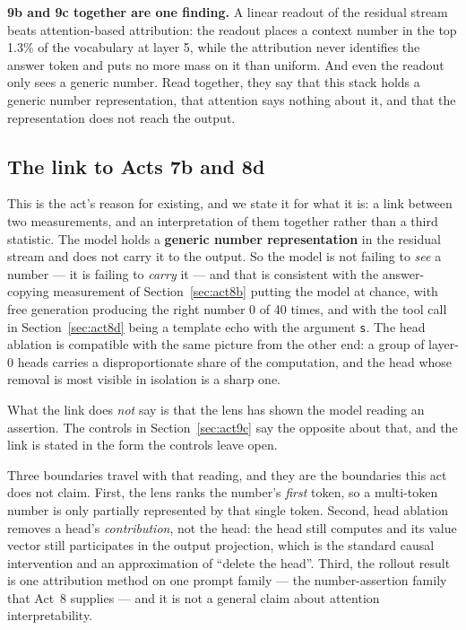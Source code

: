 \documentclass[11pt,a4paper]{article}
\begin{document}
\textbf{9b and 9c together are one finding.} A linear readout of the
residual stream beats attention-based attribution: the readout places a
context number in the top 1.3\% of the vocabulary at layer 5, while the
attribution never identifies the answer token and puts no more mass on it than
uniform. And even the readout only sees a generic number. Read together, they
say that this stack holds a generic number representation, that attention
says nothing about it, and that the representation does not reach the output.

\subsection{The link to Acts 7b and 8d}
\label{sec:act9-link}

This is the act's reason for existing, and we state it for what it is: a link
between two measurements, and an interpretation of them together rather than a
third statistic. The model holds a \textbf{generic number representation} in
the residual stream and does not carry it to the output. So the model is not
failing to \emph{see} a number --- it is failing to \emph{carry} it --- and
that is consistent with the answer-copying measurement of
Section~\ref{sec:act8b} putting the model at chance, with free generation
producing the right number 0 of 40 times, and with the tool call in
Section~\ref{sec:act8d} being a template echo with the argument \texttt{s}.
The head ablation is compatible with the same picture from the other end: a
group of layer-0 heads carries a disproportionate share of the computation,
and the head whose removal is most visible in isolation is a sharp one.

What the link does \emph{not} say is that the lens has shown the model
reading an assertion. The controls in Section~\ref{sec:act9c} say the
opposite about that, and the link is stated in the form the controls leave
open.

Three boundaries travel with that reading, and they are the boundaries this
act does not claim. First, the lens ranks the number's \emph{first} token, so
a multi-token number is only partially represented by that single token.
Second, head ablation removes a head's \emph{contribution}, not the head: the
head still computes and its value vector still participates in the output
projection, which is the standard causal intervention and an approximation of
``delete the head''. Third, the rollout result is one attribution method on one
prompt family --- the number-assertion family that Act~8 supplies --- and it
is not a general claim about attention interpretability.
\end{document}
